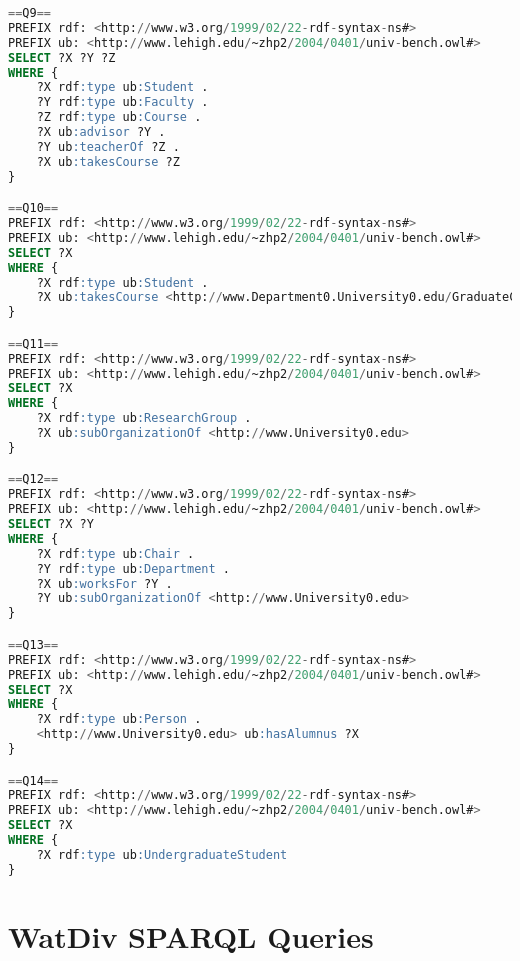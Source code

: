 \begin{lstlisting}[language=SQL, basicstyle=\ttfamily\scriptsize,morekeywords={PREFIX,OPTIONAL,FILTER,java,rdf,rdfs,url},breaklines=true,showstringspaces=false,label=lubm-sparql-queries,basewidth=0.5em]
==Q9==
PREFIX rdf: <http://www.w3.org/1999/02/22-rdf-syntax-ns#>
PREFIX ub: <http://www.lehigh.edu/~zhp2/2004/0401/univ-bench.owl#>
SELECT ?X ?Y ?Z
WHERE {
    ?X rdf:type ub:Student .
    ?Y rdf:type ub:Faculty .
    ?Z rdf:type ub:Course .
    ?X ub:advisor ?Y .
    ?Y ub:teacherOf ?Z .
    ?X ub:takesCourse ?Z
}

==Q10==
PREFIX rdf: <http://www.w3.org/1999/02/22-rdf-syntax-ns#>
PREFIX ub: <http://www.lehigh.edu/~zhp2/2004/0401/univ-bench.owl#>
SELECT ?X
WHERE {
    ?X rdf:type ub:Student .
    ?X ub:takesCourse <http://www.Department0.University0.edu/GraduateCourse0>
}

==Q11==
PREFIX rdf: <http://www.w3.org/1999/02/22-rdf-syntax-ns#>
PREFIX ub: <http://www.lehigh.edu/~zhp2/2004/0401/univ-bench.owl#>
SELECT ?X
WHERE {
    ?X rdf:type ub:ResearchGroup .
    ?X ub:subOrganizationOf <http://www.University0.edu>
}

==Q12==
PREFIX rdf: <http://www.w3.org/1999/02/22-rdf-syntax-ns#>
PREFIX ub: <http://www.lehigh.edu/~zhp2/2004/0401/univ-bench.owl#>
SELECT ?X ?Y
WHERE {
    ?X rdf:type ub:Chair .
    ?Y rdf:type ub:Department .
    ?X ub:worksFor ?Y .
    ?Y ub:subOrganizationOf <http://www.University0.edu>
}

==Q13==
PREFIX rdf: <http://www.w3.org/1999/02/22-rdf-syntax-ns#>
PREFIX ub: <http://www.lehigh.edu/~zhp2/2004/0401/univ-bench.owl#>
SELECT ?X
WHERE {
    ?X rdf:type ub:Person .
    <http://www.University0.edu> ub:hasAlumnus ?X
}

==Q14==
PREFIX rdf: <http://www.w3.org/1999/02/22-rdf-syntax-ns#>
PREFIX ub: <http://www.lehigh.edu/~zhp2/2004/0401/univ-bench.owl#>
SELECT ?X
WHERE {
    ?X rdf:type ub:UndergraduateStudent
}
\end{lstlisting}



\section{WatDiv SPARQL Queries}

